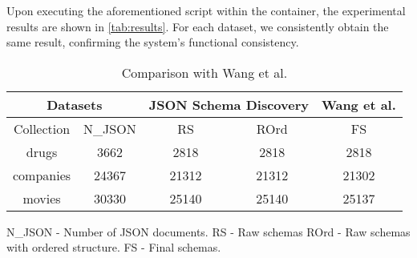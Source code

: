 \documentclass[sigconf, nonacm]{acmart}
\begin{document}
Upon executing the aforementioned script within the container, the experimental results are shown in \autoref{tab:results}. For each dataset, we consistently obtain the same result, confirming the system’s functional consistency.

\begin{table}[hb]%
	\centering
	\caption{Comparison with Wang et al.}
	\label{tab:results}
	\begin{tabular}{|c|c|c|c|c|}
		\hline
		\multicolumn{2}{|c|}{Datasets} & \multicolumn{2}{c|}{JSON Schema Discovery} & Wang et al.                 \\
		\hline
		Collection                     & N\_JSON                                    & RS          & ROrd  & FS    \\
		\hline
		drugs                          & 3662                                       & 2818        & 2818  & 2818  \\
		\hline
		companies                      & 24367                                      & 21312       & 21312 & 21302 \\
		\hline
		movies                         & 30330                                      & 25140       & 25140 & 25137 \\
		\hline
	\end{tabular}
	\parbox{0.4\textwidth}{
		\raggedright\footnotesize
		N\_JSON - Number of JSON documents. RS - Raw schemas \newline
		ROrd - Raw schemas with ordered structure. FS - Final schemas.
	}
\end{table}




\end{document}

